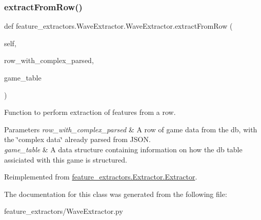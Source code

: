 \subsubsection{\texorpdfstring{extractFromRow()}{extractFromRow()}}
{\footnotesize\ttfamily def feature\+\_\+extractors.\+Wave\+Extractor.\+Wave\+Extractor.\+extract\+From\+Row (\begin{DoxyParamCaption}\item[{}]{self,  }\item[{}]{row\+\_\+with\+\_\+complex\+\_\+parsed,  }\item[{\mbox{\hyperlink{class_game_table_1_1_game_table}{Game\+Table}}}]{game\+\_\+table }\end{DoxyParamCaption})}



Function to perform extraction of features from a row. 


\begin{DoxyParams}{Parameters}
{\em row\+\_\+with\+\_\+complex\+\_\+parsed} & A row of game data from the db, with the \char`\"{}complex data\char`\"{} already parsed from J\+S\+ON. \\
\hline
{\em game\+\_\+table} & A data structure containing information on how the db table assiciated with this game is structured. \\
\hline
\end{DoxyParams}


Reimplemented from \mbox{\hyperlink{classfeature__extractors_1_1_extractor_1_1_extractor_a98fc31f77b3c7650f49480097f1f6da4}{feature\+\_\+extractors.\+Extractor.\+Extractor}}.



The documentation for this class was generated from the following file\+:\begin{DoxyCompactItemize}
\item 
feature\+\_\+extractors/Wave\+Extractor.\+py\end{DoxyCompactItemize}
